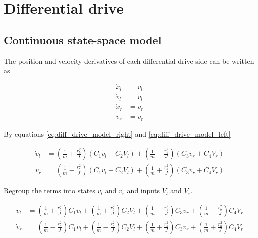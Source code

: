 \section{Differential drive}
\label{sec:ss_model_differential_drive}

\subsection{Continuous state-space model}

The position and velocity derivatives of each differential drive side can be
written as

\begin{align}
  \dot{x}_l &= v_l \label{eq:diff_drive_cont_ss_posl} \\
  \dot{v}_l &= \dot{v}_l \label{eq:diff_drive_cont_ss_vell} \\
  \dot{x}_r &= v_r \label{eq:diff_drive_cont_ss_posr} \\
  \dot{v}_r &= \dot{v}_r \label{eq:diff_drive_cont_ss_velr}
\end{align}

By equations \eqref{eq:diff_drive_model_right} and
\eqref{eq:diff_drive_model_left}

\begin{align*}
  \dot{v}_l &= \left(\frac{1}{m} + \frac{r_b^2}{J}\right)
    \left(C_1 v_l + C_2 V_l\right) +
    \left(\frac{1}{m} - \frac{r_b^2}{J}\right) \left(C_3 v_r + C_4 V_r\right) \\
  \dot{v}_r &= \left(\frac{1}{m} - \frac{r_b^2}{J}\right)
    \left(C_1 v_l + C_2 V_l\right) +
    \left(\frac{1}{m} + \frac{r_b^2}{J}\right) \left(C_3 v_r + C_4 V_r\right)
\end{align*}

Regroup the terms into states $v_l$ and $v_r$ and inputs $V_l$ and $V_r$.

\begin{align*}
  \dot{v}_l &= \left(\frac{1}{m} + \frac{r_b^2}{J}\right) C_1 v_l +
    \left(\frac{1}{m} + \frac{r_b^2}{J}\right) C_2 V_l +
    \left(\frac{1}{m} - \frac{r_b^2}{J}\right) C_3 v_r +
    \left(\frac{1}{m} - \frac{r_b^2}{J}\right) C_4 V_r \\
  \dot{v}_r &= \left(\frac{1}{m} - \frac{r_b^2}{J}\right) C_1 v_l +
    \left(\frac{1}{m} - \frac{r_b^2}{J}\right) C_2 V_l +
    \left(\frac{1}{m} + \frac{r_b^2}{J}\right) C_3 v_r +
    \left(\frac{1}{m} + \frac{r_b^2}{J}\right) C_4 V_r
\end{align*}

